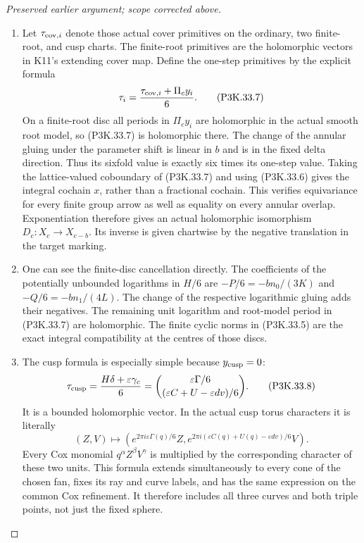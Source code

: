 \begin{proof}[Preserved earlier argument; scope corrected above]
\begin{enumerate}[label=\arabic*.]
\item Let \(\tau_{{\rm cov},i}\) denote those actual cover primitives
on the ordinary, two finite-root, and cusp charts. The finite-root
primitives are the holomorphic vectors in K11's extending cover
map. Define the one-step primitives by the explicit formula
\[
       \tau_i=\frac{\tau_{{\rm cov},i}+\Pi_cy_i}{6}.
                                                               \tag{P3K.33.7}
\]
On a finite-root disc all periods in \(\Pi_c y_i\) are
holomorphic in the actual smooth root model, so (P3K.33.7) is
holomorphic there. The change of the annular gluing under the
parameter shift is linear in \(b\) and is in the fixed delta
direction. Thus its sixfold value is exactly six times its
one-step value. Taking the lattice-valued coboundary of (P3K.33.7)
and using (P3K.33.6) gives the integral cochain \(x\), rather
than a fractional cochain. This verifies equivariance for every
finite group arrow as well as equality on every annular overlap.
Exponentiation therefore gives an actual holomorphic isomorphism
\(D_c:X_c\longrightarrow X_{c-b}\). Its inverse is given
chartwise by the negative translation in the target marking.

\item One can see the finite-disc cancellation directly. The coefficients
of the potentially unbounded logarithms in \(H/6\) are
\(-P/6=-bn_0/(3K)\) and
\(-Q/6=-bn_1/(4L)\). The change of the respective logarithmic
gluing adds their negatives. The remaining unit logarithm and
root-model period in (P3K.33.7) are holomorphic. The finite cyclic
norms in (P3K.33.5) are the exact integral compatibility at the
centres of those discs.

\item The cusp formula is especially simple because \(y_{\rm cusp}=0\):
\[
 \tau_{\rm cusp}
     =\frac{H\delta+\varepsilon\gamma_c}{6}
     =\binom{\varepsilon\Gamma/6}
              {(\varepsilon C+U-\varepsilon dv)/6}.    \tag{P3K.33.8}
\]
It is a bounded holomorphic vector. In the actual cusp torus
characters it is literally
\[
 (Z,V)\longmapsto
 \left(e^{2\pi i\varepsilon\Gamma(q)/6}Z,
       e^{2\pi i(\varepsilon C(q)+U(q)-\varepsilon dv)/6}V\right).
                                                               \tag{P3K.33.9}
\]
Every Cox monomial \(q^\alpha Z^\beta V^\gamma\) is multiplied
by the corresponding character of these two units. This formula
extends simultaneously to every cone of the chosen fan, fixes
its ray and curve labels, and has the same expression on the
common Cox refinement. It therefore includes all three curves
and both triple points, not just the fixed sphere.


\end{enumerate}
\end{proof}
